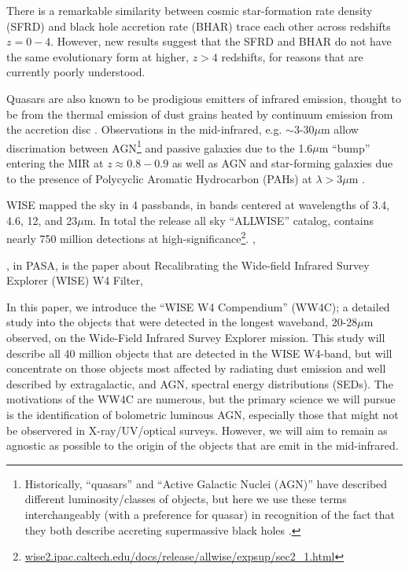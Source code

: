 \documentclass[usenatbib]{mnras}
\begin{document}
There is a remarkable similarity between cosmic star-formation rate
density (SFRD) and black hole accretion rate (BHAR) trace each other
\citep[with a normalisation factor of $\sim3000$,][]{Willott2013b,
MadauDickinson2014} across redshifts $z=0-4$.  However, new results
\citet[e.g., ][]{Vito2018a, Calhau2018} suggest that the SFRD and BHAR
do not have the same evolutionary form at higher, $z>4$ redshifts, for
reasons that are currently poorly understood.

Quasars are also known to be prodigious emitters of infrared emission,
thought to be from the thermal emission of dust grains heated by
continuum emission from the accretion disc \citep[][]{Hill2014,
Hickox2017}.  Observations in the mid-infrared, e.g. $\sim$3-30$\mu$m
allow discrimation between AGN\footnote{Historically, ``quasars'' and
``Active Galactic Nuclei (AGN)'' have described different
luminosity/classes of objects, but here we use these terms
interchangeably (with a preference for quasar) in recognition of the
fact that they both describe accreting supermassive black holes
\citep[e.g.][]{Haardt2016book}.}  and passive galaxies due to the
1.6$\mu$m ``bump'' entering the MIR at $z\approx0.8-0.9$ \citep[e.g.,
][]{Eisenhardt1994, Lacy2004, Stern2005, Richards2006b, Timlin2016} as
well as AGN and star-forming galaxies due to the presence of
Polycyclic Aromatic Hydrocarbon (PAHs) at $\lambda >3\mu$m
\citep[e.g., ][]{Yan2007, Tielens2008}.

WISE mapped the sky in 4 passbands, in bands centered at wavelengths
of 3.4, 4.6, 12, and 23$\mu$m.  In total the release all sky
``ALLWISE'' catalog, contains nearly 750 million detections at
high-significance\footnote{\href{http://wise2.ipac.caltech.edu/docs/release/allwise/expsup/sec2\_1.html}{wise2.ipac.caltech.edu/docs/release/allwise/expsup/sec2\_1.html}}.
\citet{Assef2013}, \citet{Stern2012}

\citet{Brown2014b}, in PASA, is the paper about Recalibrating the Wide-field Infrared Survey Explorer (WISE) W4 Filter,

In this paper, we introduce the ``WISE W4 Compendium'' (WW4C); a
detailed study into the objects that were detected in the longest
waveband, 20-28$\mu$m observed, on the Wide-Field Infrared Survey
Explorer \citep[WISE;][]{Wright2010, Cutri2013} mission.
This study will describe all 40 million objects that are detected in
the WISE W4-band, but will concentrate on those objects most affected
by radiating dust emission and well described by extragalactic, and
AGN, spectral energy distributions (SEDs).  The motivations of the
WW4C are numerous, but the primary science we will pursue is the
identification of bolometric luminous AGN, especially those that might
not be observered in X-ray/UV/optical surveys.
However, we will aim to remain as agnostic as possible to the origin
of the objects that are emit in the mid-infrared.
\end{document}
